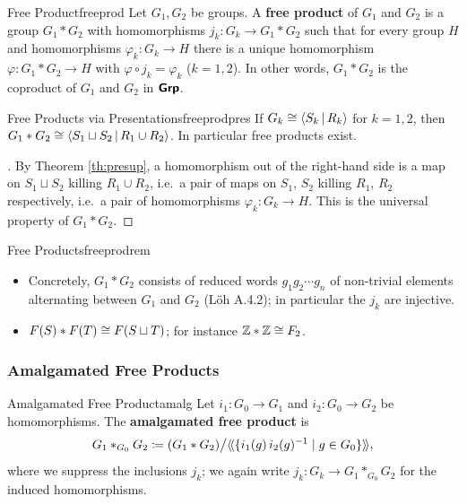 \begin{definition}{Free Product}{freeprod}
  Let $G_1,G_2$ be groups. A \textbf{free product} of $G_1$ and $G_2$ is a group $G_1\ast G_2$ with homomorphisms $j_k:G_k\to G_1\ast G_2$ such that for every group $H$ and homomorphisms $\varphi_k:G_k\to H$ there is a unique homomorphism $\varphi:G_1\ast G_2\to H$ with $\varphi\circ j_k=\varphi_k$ ($k=1,2$). In other words, $G_1\ast G_2$ is the coproduct of $G_1$ and $G_2$ in $\bm{\mathsf{Grp}}$.
\end{definition}

\begin{proposition}{Free Products via Presentations}{freeprodpres}
  If $G_k\cong\left\langle S_k\,\middle|\,R_k\right\rangle$ for $k=1,2$, then $G_1\ast G_2\cong\left\langle S_1\sqcup S_2\,\middle|\,R_1\cup R_2\right\rangle$. In particular free products exist.
\end{proposition}

\begin{proof}[]
  By Theorem \ref{th:presup}, a homomorphism out of the right-hand side is a map on $S_1\sqcup S_2$ killing $R_1\cup R_2$, i.e.\ a pair of maps on $S_1$, $S_2$ killing $R_1$, $R_2$ respectively, i.e.\ a pair of homomorphisms $\varphi_k:G_k\to H$. This is the universal property of $G_1\ast G_2$.
\end{proof}

\begin{remark}{Free Products}{freeprodrem}
  \begin{itemize}
    \item Concretely, $G_1\ast G_2$ consists of reduced words $g_1g_2\cdots g_n$ of non-trivial elements alternating between $G_1$ and $G_2$ (Löh A.4.2); in particular the $j_k$ are injective.
    \item $F(S)\ast F(T)\cong F(S\sqcup T)$; for instance $\mathbb{Z}\ast\mathbb{Z}\cong F_2$.
  \end{itemize}
\end{remark}

\subsubsection{Amalgamated Free Products}

\begin{definition}{Amalgamated Free Product}{amalg}
  Let $i_1:G_0\to G_1$ and $i_2:G_0\to G_2$ be homomorphisms. The \textbf{amalgamated free product} is
  \[
    G_1\ast_{G_0}G_2\coloneq (G_1\ast G_2)\big/\langle\!\langle \{i_1(g)\,i_2(g)^{-1}\mid g\in G_0\}\rangle\!\rangle,
  \]
  where we suppress the inclusions $j_k$; we again write $j_k:G_k\to G_1\ast_{G_0}G_2$ for the induced homomorphisms.
\end{definition}


